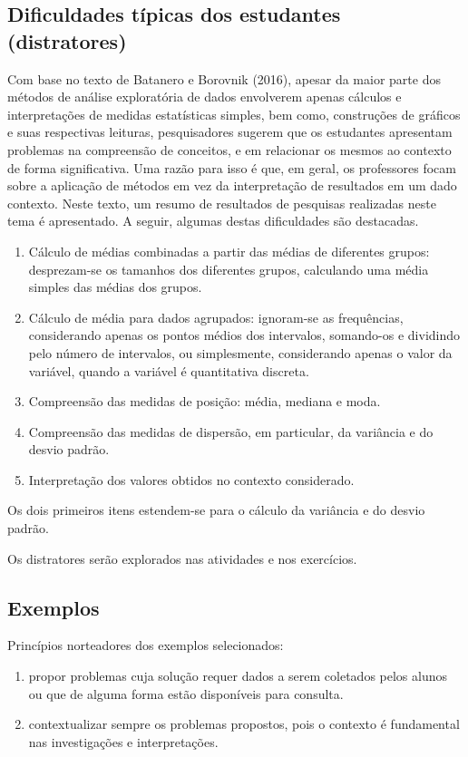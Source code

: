 \begin{apresentacao}
\subsection{Dificuldades típicas dos estudantes (distratores)}

Com base no texto de Batanero e Borovnik (2016), apesar da maior parte dos métodos de análise exploratória de dados envolverem apenas cálculos e interpretações de medidas estatísticas simples, bem como, construções de gráficos e suas respectivas leituras, pesquisadores sugerem que os estudantes apresentam problemas na compreensão de conceitos, e em relacionar os mesmos ao contexto de forma significativa. Uma razão para isso é que, em geral, os professores focam sobre a aplicação de métodos em vez da interpretação de resultados em um dado contexto. Neste texto, um resumo de resultados de pesquisas realizadas neste tema é apresentado. A seguir, algumas destas dificuldades são destacadas.

\begin{enumerate}
\item Cálculo de médias combinadas a partir das médias de diferentes grupos: desprezam-se os tamanhos dos diferentes grupos, calculando uma média simples das médias dos grupos.
\item Cálculo de média para dados agrupados: ignoram-se as frequências, considerando apenas os pontos médios dos intervalos, somando-os e dividindo pelo número de intervalos, ou simplesmente, considerando apenas o valor da variável, quando a variável é quantitativa discreta.
\item Compreensão das medidas de posição: média, mediana e moda.
\item Compreensão das medidas de dispersão, em particular, da variância e do desvio padrão.
\item Interpretação dos valores obtidos no contexto considerado.
\end{enumerate}

Os dois primeiros itens estendem-se para o cálculo da variância e do desvio padrão.

Os distratores serão explorados nas atividades e nos exercícios.

\subsection{Exemplos}

Princípios norteadores dos exemplos selecionados:

\begin{enumerate}
\item propor problemas cuja solução requer dados a serem coletados pelos alunos ou que de alguma forma estão disponíveis para consulta.
\item contextualizar sempre os problemas propostos, pois o contexto é fundamental nas investigações e interpretações.
\end{enumerate}

\end{apresentacao}
